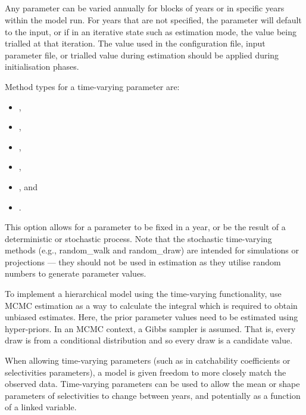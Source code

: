 \subsection{}\label{sec:TimeVarying} 

Any parameter can be varied annually for blocks of years or in specific years within the model run. For years that are not specified, the parameter will default to the input, or if in an iterative state such as estimation mode, the value being trialled at that iteration. The value used in the configuration file, input parameter file, or trialled value during estimation should be applied during initialisation phases.

Method types for a time-varying parameter are:

\begin{itemize}
\item {},
\item {},
\item {},
\item {},
\item {}, and
\item {}.
\end{itemize}

This option allows for a parameter to be fixed in a year, or be the result of a deterministic or stochastic process. Note that the stochastic time-varying methods (e.g., random\_walk and random\_draw) are intended for simulations or projections --- they should not be used in estimation as they utilise random numbers to generate parameter values. 

To implement a hierarchical model using the time-varying functionality, use MCMC estimation as a way to calculate the integral which is required to obtain unbiased estimates. Here, the prior parameter values need to be estimated using hyper-priors. In an MCMC context, a Gibbs sampler is assumed. That is, every draw is from a conditional distribution and so every draw is a candidate value.

When allowing time-varying parameters (such as in catchability coefficients or selectivities parameters), a model is given freedom to more closely match the observed data. Time-varying parameters can be used to allow the mean or shape parameters of selectivities to change between years, and potentially as a function of a linked variable.

